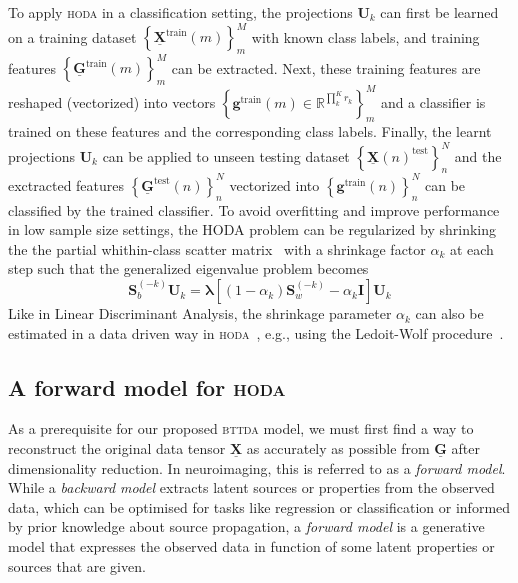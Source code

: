 \documentclass[twocolumn]{article}
\newcommand{\ten}[1]{\underline{\mathbf{#1}}} %
\newcommand{\mat}[1]{\mathbf{#1}} %
\renewcommand{\vec}[1]{\mathbf{#1}} %
\begin{document}
To apply \textsc{hoda} in a classification setting, the projections $\mat{U}_k$
can first be learned on a training dataset
$\left\{\ten{X}^\text{train}(m)\right\}_m^M$ with known class labels, and
training features $\left\{\ten{G}^\text{train}(m)\right\}_m^M$ can be extracted.
Next, these training features are reshaped (vectorized) into vectors
$\left\{\vec{g}^\text{train}(m) \in \mathbb{R}^{\prod_k^Kr_k}\right\}_m^M$ and a classifier is
trained on these features and the corresponding class labels.
Finally, the learnt projections $\mat{U}_k$ can be applied to unseen testing
dataset $\left\{\ten{X}(n)^\text{test}\right\}_n^N$ and the exctracted features
$\left\{\ten{G}^\text{test}(n)\right\}_n^N$ vectorized into
$\left\{\vec{g}^\text{train}(n)\right\}_n^N$ can be
classified by the trained classifier.
To avoid overfitting and improve performance in low sample size settings, the
\textsc{HODA} problem can be regularized by shrinking the the partial
whithin-class scatter matrix~\cite{Phan2010} with a shrinkage factor
$\alpha_k$ at each step such that the generalized eigenvalue problem becomes
\begin{equation}
	\mat{S}_b^{(-k)}\mat{U}_k =
\mat{\lambda}\left[(1-\alpha_k)\mat{S}_w^{(-k)}-\alpha_k\mat{I}\right]\mat{U}_k
\end{equation}
Like in Linear Discriminant Analysis, the shrinkage parameter $\alpha_k$ can
also be estimated in a data driven way in \textsc{hoda}~\cite{Jorajuria2022},
e.g., using the Ledoit-Wolf procedure~\cite{Ledoit2003}.


\subsection{A forward model for \textsc{hoda}}
As a prerequisite for our proposed \textsc{bttda} model, we must first find a
way to reconstruct the original data tensor $\ten{X}$ as accurately as possible
from $\ten{G}$ after dimensionality reduction.
In neuroimaging, this is referred to as a \textit{forward model}.
While a \textit{backward model} extracts latent sources or properties from the observed
data, which can be optimised for tasks like regression or classification or
informed by prior knowledge about source propagation, a \textit{forward model} is a
generative model that expresses the observed data in function of some latent
properties or sources that are given.
\end{document}
